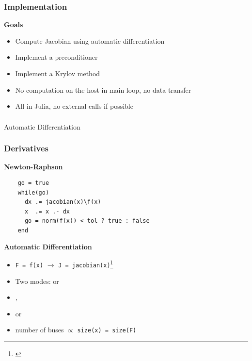 \begin{frame}
  \frametitle{Implementation}
  {\bf Goals}
  \begin{itemize}
    \item Compute Jacobian using automatic differentiation
    \item Implement a preconditioner
    \item Implement a Krylov method
    \item No computation on the host in main loop, no data transfer
    \item All in Julia, no external calls if possible
  \end{itemize}
\end{frame}

\begin{frame}
  \frametitle{}
  \centering
  {\Huge Automatic Differentiation}
\end{frame}

\begin{frame}[fragile]
  \frametitle{Derivatives}
  {\bf Newton-Raphson}
  \begin{minipage}{0.8\textwidth}
    \begin{lstlisting}
    go = true
    while(go)
      dx .= jacobian(x)\f(x)
      x  .= x .- dx
      go = norm(f(x)) < tol ? true : false
    end
    \end{lstlisting}
   \end{minipage}
  {\bf Automatic Differentiation}
  \begin{itemize}
    \item \lstinline{F = f(x)} $\rightarrow$ \alert{\lstinline{J = jacobian(x)}}\footnote{\cite{RevelsLubinPapamarkou2016}}
    \item Two modes:  or 
    \item {},  
    \item {} or 
    \item number of buses $\propto$ \lstinline{size(x) = size(F)}
  \end{itemize}
\end{frame}

